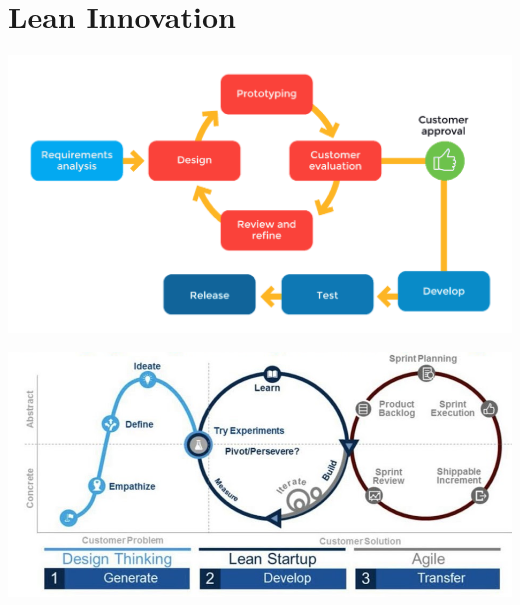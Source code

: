 \documentclass{article}[18pt]
\begin{document}
\section{Lean Innovation}
\begin{center}
	\includegraphics[scale=0.7]{"Lean Innovation"}
\end{center}
\begin{center}
	\includegraphics[scale=0.7]{Lean}
\end{center}
\end{document}

